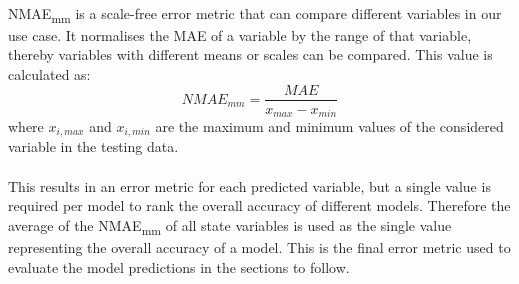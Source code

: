         \paragraph{}
        NMAE\textsubscript{mm} is a scale-free error metric that can compare different variables in our use case.
        It normalises the MAE of a variable by the range of that variable, 
        thereby variables with different means or scales can be compared.
        This value is calculated as:
        \begin{equation}
            NMAE_{mm} = \frac{ MAE }{ x_{max} - x_{min} }
        \end{equation}
        where         
        $x_{i, max}$ and $x_{i, min}$ are the maximum and minimum values 
        of the considered variable in the testing data.

        \paragraph{}
        This results in an error metric for each predicted variable, 
        but a single value is required per model 
        to rank the overall accuracy of different models.
        Therefore the average of the NMAE\textsubscript{mm} of all state variables is used as the single value 
        representing the overall accuracy of a model.
        This is the final error metric used to evaluate the model predictions 
        in the sections to follow.


